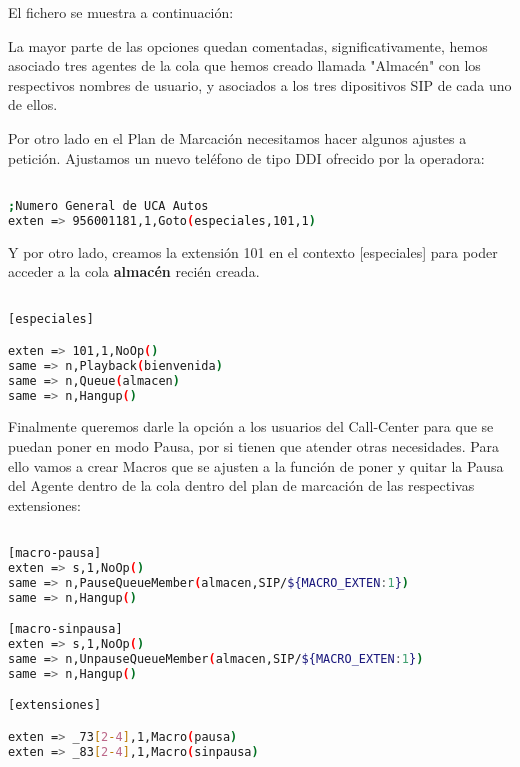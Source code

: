 El fichero se muestra a continuación:



La mayor parte de las opciones quedan comentadas, significativamente, hemos asociado tres agentes de la cola que hemos creado llamada "Almacén" con los respectivos nombres de usuario, y asociados a los tres dipositivos SIP de cada uno de ellos.

Por otro lado en el Plan de Marcación necesitamos hacer algunos ajustes a petición. Ajustamos un nuevo teléfono de tipo DDI ofrecido por la operadora:

\begin{lstlisting}[language=bash,title={/etc/asterisk/extensions.conf}]

;Numero General de UCA Autos
exten => 956001181,1,Goto(especiales,101,1)

\end{lstlisting}

Y por otro lado, creamos la extensión 101 en el contexto [especiales] para poder acceder a la cola \textbf{almacén} recién creada.

\begin{lstlisting}[language=bash,title={/etc/asterisk/extensions.conf}]

[especiales]

exten => 101,1,NoOp()
same => n,Playback(bienvenida)
same => n,Queue(almacen)
same => n,Hangup()

\end{lstlisting}

Finalmente queremos darle la opción a los usuarios del Call-Center para que se puedan poner en modo Pausa, por si tienen que atender otras necesidades.
Para ello vamos a crear Macros que se ajusten a la función de poner y quitar la Pausa del Agente dentro de la cola dentro del plan de marcación de las respectivas extensiones:

\begin{lstlisting}[language=bash,title={/etc/asterisk/extensions.conf}]

[macro-pausa]
exten => s,1,NoOp()
same => n,PauseQueueMember(almacen,SIP/${MACRO_EXTEN:1})
same => n,Hangup()

[macro-sinpausa]
exten => s,1,NoOp()
same => n,UnpauseQueueMember(almacen,SIP/${MACRO_EXTEN:1})
same => n,Hangup()

[extensiones]

exten => _73[2-4],1,Macro(pausa)
exten => _83[2-4],1,Macro(sinpausa)

\end{lstlisting}

